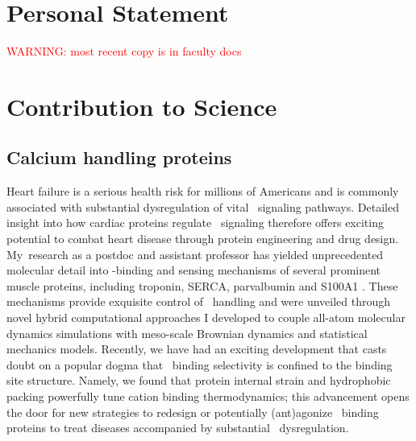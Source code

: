 \newcommand\person{My}

\newpage
\renewcommand{\thesection}{\Alph{section}}
\section{Personal Statement}
%

\textcolor{red}{WARNING: most recent copy is in faculty docs}
\setcounter{section}{2} 
\section{Contribution to Science} 
\subsection*{Calcium handling proteins}
\begin{refsection}
Heart failure is a serious health risk for millions of Americans and is commonly associated with substantial dysregulation of vital \catwo\ signaling pathways.  
Detailed insight into how cardiac proteins regulate \catwo\ signaling therefore offers exciting potential to combat heart disease through protein engineering and drug design.
\person\ research as a postdoc and assistant professor has yielded unprecedented molecular detail into \catwo-binding and sensing mechanisms of several prominent muscle proteins, including troponin, SERCA, parvalbumin and S100A1 \autocite{Lindert2015,Cheng2014,Kekenes-Huskey2012c,Kekenes-Huskey2012a,Lindert2012a,Scott2016,Kucharski2016}.  
These mechanisms provide exquisite control of \catwo\ handling and were unveiled through novel hybrid computational approaches I developed to couple all-atom molecular dynamics simulations with meso-scale Brownian dynamics and statistical mechanics models.
Recently, we have had an exciting development that casts doubt on a popular dogma that \catwo\ binding selectivity is confined to the binding site structure.
Namely, we found that protein internal strain and hydrophobic packing powerfully tune cation binding thermodynamics; this advancement opens the door for new strategies to redesign or potentially (ant)agonize \catwo\ binding proteins to treat diseases accompanied by substantial \catwo\ dysregulation. 

\printbibliography[heading=none] %
\end{refsection}

